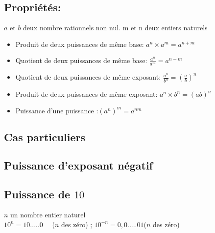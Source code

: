 \documentclass[a4paper,12pt,landscape,twocolumn]{report}
\begin{document}
\subsection{Propriétés:}
\begin{tcolorbox}[colframe =gray,
	title = {Propriétés: }, coltitle= black]
	$a$ et $b$ deux  nombre rationnels non nul. m et n deux entiers naturels 
	\begin{itemize}
		\item  	Produit de deux puissances de même base: $a^n \times a^m =a^{n+m} $
		\item 	Quotient de deux puissances de même base: $\frac{a^n}{a^m}=a^{n-m}$
    	\item 	Quotient de deux puissances de même exposant: $\frac{a^n}{b^n}=(\frac{a}{b})^{n}$
		\item  	Produit de deux puissances de même exposant: $a^n \times b^n=(ab)^n$
		\item  	Puissance d’une puissance :$(a^n)^m =a^{nm} $
	\end{itemize}
\end{tcolorbox}
\subsection{Cas particuliers}
\subsection{Puissance d’exposant négatif }

\subsection{Puissance de $10$}
\begin{tcolorbox}[colframe =gray,
	title = {Propriété: }, coltitle= black]
	$n$ un nombre entier naturel \\
	$10^n =10 .....0 \quad$ ($n$ des zéro) \qquad; \qquad $10^{-n} =0,0 .....01 $\quad ($n$ des zéro) 
	
\end{tcolorbox}
\end{document}

